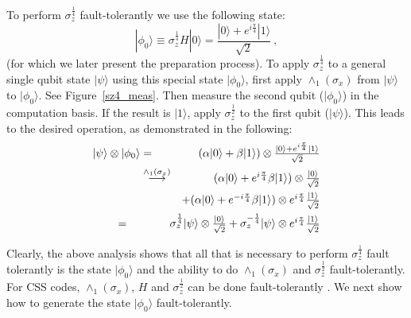 \documentclass[twocolumn,11pt]{article}
\begin{document}
To perform $\sigma_z^{\frac{1}{4}}$ fault-tolerantly we use the following
state:
\begin{equation}\label{phi0}
|\phi_0\rangle\equiv\sigma_z^{\frac{1}{4}}H|0\rangle=\frac{|0\rangle +
e^{i\frac{\pi}{4}}|1\rangle}{\sqrt{2}} \ ,
\end{equation} 
(for which we later present the preparation process).
To apply $\sigma_z^{\frac{1}{4}}$ to a general single qubit state
$|\psi\rangle$ using this special state $|\phi_0\rangle$, first apply
$\wedge_1(\sigma_x)$ from $|\psi\rangle$ to $|\phi_0\rangle$.  See
Figure~\ref{sz4_meas}.
Then measure the second qubit ($|\phi_0\rangle$) in the computation basis.
If the result is $|1\rangle$, apply $\sigma_z^{\frac{1}{2}}$ 
to the
first qubit ($|\psi\rangle$). This leads to the desired operation,
as demonstrated in the following:
\begin{eqnarray*}
|\psi\rangle\otimes|\phi_0\rangle &=&
\mbox{$(\alpha|0\rangle+\beta|1\rangle)\otimes
 \frac{|0\rangle+e^{i\frac{\pi}{4}}|1\rangle}{\sqrt2} $}\\
 &\overset{\wedge_1(\sigma_x)}{\longrightarrow}&
  \mbox{$(\alpha|0\rangle+e^{i\frac{\pi}{4}}\beta|1\rangle)
   \otimes\frac{|0\rangle}{\sqrt{2}} $}\\
 &&\mbox{$+(\alpha|0\rangle+e^{-i\frac{\pi}{4}}\beta|1\rangle)
   \otimes e^{i\frac{\pi}{4}}\frac{|1\rangle}{\sqrt{2}} $}\\
 &\hspace*{-8mm} =& \hspace*{-8mm} \mbox{$\sigma_z^{\frac{1}{4}}|
 \psi\rangle\otimes\frac{|0\rangle}{\sqrt{2}}
  +\sigma_z^{-\frac{1}{4}}|\psi\rangle
   \otimes e^{i\frac{\pi}{4}}\frac{|1\rangle}{\sqrt{2}} $}
\end{eqnarray*}

Clearly, the above analysis shows that all that is necessary to perform
$\sigma_z^{\frac{1}{4}}$ fault tolerantly is the state $|\phi_0\rangle$
and the ability to do $\wedge_1(\sigma_x)$ and $\sigma_z^{\frac{1}{2}}$
fault-tolerantly. For CSS codes, $\wedge_1(\sigma_x)$, $H$ and
$\sigma_z^{\frac{1}{2}}$ can be done fault-tolerantly
\cite{shorFT,Gottesman-TFTC}. We next show how to generate the state 
$|\phi_0\rangle$ fault-tolerantly.
\end{document}
